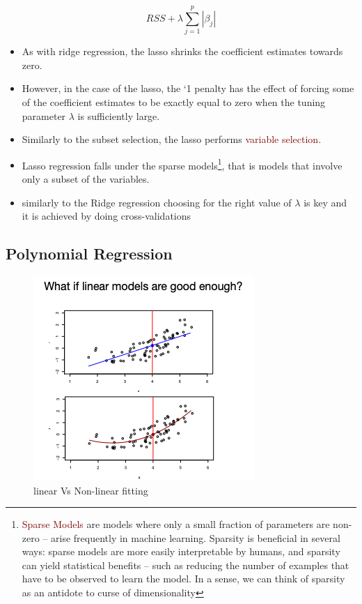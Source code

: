 \documentclass{tufte-handout}
\newcommand{\hlred}[1]{\textcolor{Maroon}{#1}}%
\begin{document}
\begin{equation}
    RSS +\lambda\sum_{j=1}^{p}|\beta_j|
\end{equation}
\begin{itemize}
    \item As with ridge regression, the lasso shrinks the coefficient
estimates towards zero.
    \item However, in the case of the lasso, the `1 penalty has the effect of forcing some of the coefficient estimates to be exactly equal to zero when the tuning parameter \(\lambda\) is sufficiently large.
    \item Similarly to the subset selection, the lasso performs \hlred{variable selection}.
    \item Lasso regression falls under the sparse models\footnote{\hlred{Sparse Models} are models where only a small fraction of parameters are non-zero – arise frequently in machine learning. Sparsity is beneficial in several ways: sparse models are more easily interpretable by humans, and sparsity can yield statistical benefits – such as reducing the number of examples that have to be observed to learn the model. In a sense, we can think of sparsity as an antidote to curse of dimensionality}, that is models that involve only a subset of the variables.
    \item similarly to the Ridge regression choosing for the right value of \(\lambda\) is key and it is achieved by doing cross-validations
\end{itemize}

\subsection{Polynomial Regression}


 \begin{figure}
  \includegraphics{polynomial.png}
  \caption{linear Vs Non-linear fitting}
  \label{fig:textfig}
\end{figure}
\end{document}
